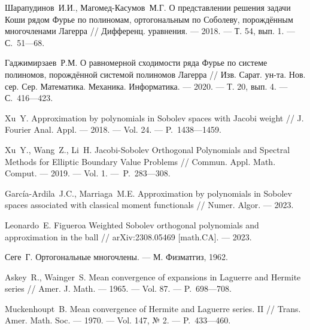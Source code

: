 \begin{thebibliography}{11}
{Шарапудинов~И.И., Магомед-Касумов~М.Г.} 
О представлении решения задачи Коши рядом Фурье по полиномам, ортогональным по Соболеву, порождённым многочленами Лагерра 
// 
Дифференц. уравнения. 
--- 2018. 
--- Т. 54, вып. 1. 
--- С.~51---68.





{Гаджимирзаев~Р.М.} 
О равномерной сходимости ряда Фурье по системе полиномов, порождённой системой полиномов Лагерра 
// 
Изв. Сарат. ун-та. Нов. сер. Сер. Математика. Механика. Информатика. 
--- 2020. 
--- Т. 20, вып. 4. 
--- С.~416---423.






{Xu~Y.} 
Approximation by polynomials in Sobolev spaces with Jacobi weight 
// 
J. Fourier Anal. Appl. 
--- 2018. 
--- Vol. 24. 
--- P.~1438---1459.



{Xu~Y., Wang~Z., Li~H.} 
Jacobi-Sobolev Orthogonal Polynomials and Spectral Methods for Elliptic Boundary Value Problems 
//
Commun. Appl. Math. Comput.
--- 2019.
--- Vol. 1.
---~P.~283---308.

{Garc\'ia-Ardila~J.C., Marriaga~M.E.}
Approximation by polynomials in Sobolev spaces associated with classical moment functionals 
//
Numer. Algor.
--- 2023.


{Leonardo~E. Figueroa} 
Weighted Sobolev orthogonal polynomials and approximation in the ball 
// 
arXiv:2308.05469 [math.CA].
--- 2023.





			
{Сеге~Г.} 
Ортогональные многочлены. 
--- М. Физматгиз, 1962.





{Askey~R., Wainger~S.} 
Mean convergence of expansions in Laguerre and Hermite series 
// 
Amer. J. Math.
--- 1965.
--- Vol. 87.
--- P.~698---708.





{Muckenhoupt~B.} 
Mean convergence of Hermite and Laguerre series. II 
// 
Trans. Amer. Math. Soc. 
--- 1970.
--- Vol. 147, № 2.
--- P.~433---460.






\end{thebibliography}
